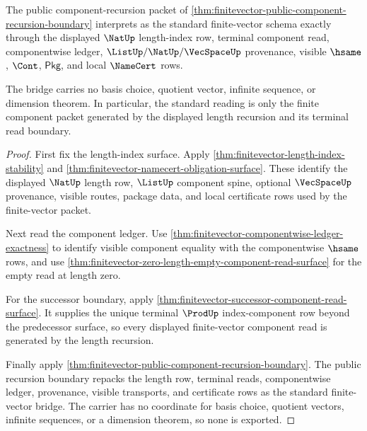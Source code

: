 \begin{theorem}
\label{thm:finitevector-standard-bridge-boundary}
The public component-recursion packet of
\autoref{thm:finitevector-public-component-recursion-boundary} interprets as
the standard finite-vector schema exactly through the displayed
$\NatUp$ length-index row, terminal component read, componentwise ledger,
$\ListUp/\NatUp/\VecSpaceUp$ provenance, visible $\hsame$, $\Cont$,
$\mathsf{Pkg}$, and local $\NameCert$ rows.

The bridge carries no basis choice, quotient vector, infinite sequence, or
dimension theorem. In particular, the standard reading is only the finite
component packet generated by the displayed length recursion and its terminal
read boundary.
\end{theorem}
\begin{proof}
First fix the length-index surface. Apply
\autoref{thm:finitevector-length-index-stability} and
\autoref{thm:finitevector-namecert-obligation-surface}. These identify the
displayed $\NatUp$ length row, $\ListUp$ component spine, optional
$\VecSpaceUp$ provenance, visible routes, package data, and local certificate
rows used by the finite-vector packet.

Next read the component ledger. Use
\autoref{thm:finitevector-componentwise-ledger-exactness} to identify visible
component equality with the componentwise $\hsame$ rows, and use
\autoref{thm:finitevector-zero-length-empty-component-read-surface} for the
empty read at length zero.

For the successor boundary, apply
\autoref{thm:finitevector-successor-component-read-surface}. It supplies the
unique terminal $\ProdUp$ index-component row beyond the predecessor surface,
so every displayed finite-vector component read is generated by the length
recursion.

Finally apply
\autoref{thm:finitevector-public-component-recursion-boundary}. The public
recursion boundary repacks the length row, terminal reads, componentwise
ledger, provenance, visible transports, and certificate rows as the standard
finite-vector bridge. The carrier has no coordinate for basis choice, quotient
vectors, infinite sequences, or a dimension theorem, so none is exported.
\end{proof}

